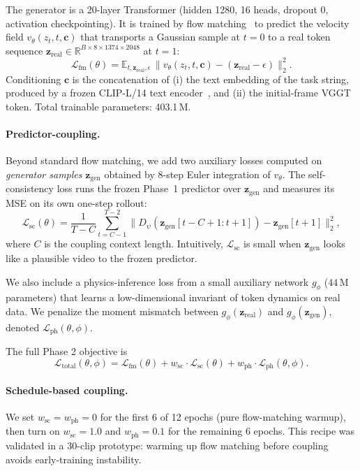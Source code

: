\documentclass[10pt,letterpaper]{article}
\newcommand{\fmloss}{\mathcal{L}_{\text{fm}}}
\newcommand{\scloss}{\mathcal{L}_{\text{sc}}}
\newcommand{\phloss}{\mathcal{L}_{\text{ph}}}
\newcommand{\zgen}{\mathbf{z}_{\text{gen}}}
\newcommand{\zreal}{\mathbf{z}_{\text{real}}}
\begin{document}
The generator is a 20-layer Transformer (hidden 1280, 16 heads, dropout 0, activation checkpointing). It is trained by flow matching~\citep{flow_matching_lipman_2022,sd3_2024} to predict the velocity field $v_\theta(z_t, t, \mathbf{c})$ that transports a Gaussian sample at $t=0$ to a real token sequence $\zreal \in \mathbb{R}^{B \times 8 \times 1374 \times 2048}$ at $t=1$:
\begin{equation}
\fmloss(\theta) = \mathbb{E}_{t, \zreal, \epsilon}\, \big\| v_\theta(z_t, t, \mathbf{c}) - (\zreal - \epsilon) \big\|_2^2.
\end{equation}
Conditioning $\mathbf{c}$ is the concatenation of (i) the text embedding of the task string, produced by a frozen CLIP-L/14 text encoder~\citep{clip_2021}, and (ii) the initial-frame VGGT token. Total trainable parameters: 403.1\,M.

\paragraph{Predictor-coupling.} Beyond standard flow matching, we add two auxiliary losses computed on \emph{generator samples} $\zgen$ obtained by 8-step Euler integration of $v_\theta$. The self-consistency loss runs the frozen Phase~1 predictor over $\zgen$ and measures its MSE on its own one-step rollout:
\begin{equation}
\scloss(\theta) = \frac{1}{T-C} \sum_{t=C-1}^{T-2} \big\| D_\psi(\zgen[t-C+1:t+1]) - \zgen[t+1] \big\|_2^2,
\label{eq:sc}
\end{equation}
where $C$ is the coupling context length. Intuitively, $\scloss$ is small when $\zgen$ looks like a plausible video to the frozen predictor.

We also include a physics-inference loss from a small auxiliary network $g_\phi$ (44\,M parameters) that learns a low-dimensional invariant of token dynamics on real data. We penalize the moment mismatch between $g_\phi(\zreal)$ and $g_\phi(\zgen)$, denoted $\phloss(\theta, \phi)$.

The full Phase 2 objective is
\begin{equation}
\mathcal{L}_{\text{total}}(\theta, \phi) = \fmloss(\theta) + w_{\text{sc}} \cdot \scloss(\theta) + w_{\text{ph}} \cdot \phloss(\theta, \phi).
\end{equation}

\paragraph{Schedule-based coupling.} We set $w_{\text{sc}} = w_{\text{ph}} = 0$ for the first 6 of 12 epochs (pure flow-matching warmup), then turn on $w_{\text{sc}} = 1.0$ and $w_{\text{ph}} = 0.1$ for the remaining 6 epochs. This recipe was validated in a 30-clip prototype: warming up flow matching before coupling avoids early-training instability.
\end{document}
